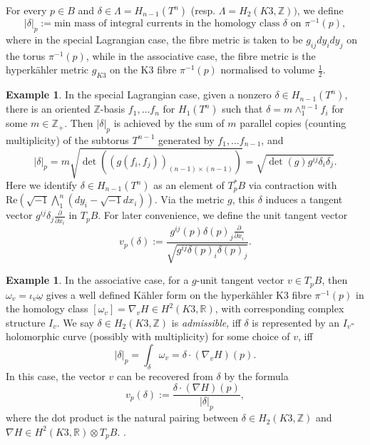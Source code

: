 \documentclass{article}
\theoremstyle{definition}
\newtheorem{eg}[thm]{Example}
\newcommand{\R}{\mathbb{R}}
\newcommand{\Z}{\mathbb{Z}}
\begin{document}
		
		
		

		For every $p\in B$ and $\delta\in \Lambda= H_{n-1}(T^n)$ (resp. $\Lambda= H_2(K3,\Z))$, we define 
		\begin{equation}
		|\delta|_p:=  \text{min mass of integral currents in the homology class $\delta$ on  $\pi^{-1}(p)$} ,
		\end{equation}
		where in the special Lagrangian case, the fibre metric is taken to be $g_{ij} dy_i dy_j$ on the torus $\pi^{-1}(p)$, while in the associative case, the fibre metric is the hyperk\"ahler metric $g_{K3}$ on the K3 fibre $\pi^{-1}(p)$  normalised to volume $\frac{1}{2}$. 




\begin{eg}\label{eg:minareatorus}
In the special Lagrangian case, given a nonzero $\delta\in H_{n-1}(T^n)$, there is an oriented $\Z$-basis $f_1,\ldots f_n$ for $H_1(T^n)$ such that $\delta= m \wedge_1^{n-1} f_i$ for some $m\in \Z_+$. Then $|\delta|_p$ is achieved by the sum of $m$ parallel copies (counting multiplicity) of the subtorus $T^{n-1}$ generated by $f_1,\ldots f_{n-1}$, and 
\[
|\delta|_p= m \sqrt{  \det( ( g(f_i, f_j) )_{(n-1)\times (n-1)}   ) }=     \sqrt{ \det(g)  g^{ij} \delta_i \delta_j }.
\]
Here we identify $\delta \in H_{n-1}(T^n)$ as an element of $T_p^* B$ via contraction with $\text{Re}(\sqrt{-1} \bigwedge_1^n(dy_i- \sqrt{-1} dx_i) )$. Via the metric $g$, this $\delta$ induces a tangent vector $g^{ij}\delta_j \frac{\partial}{\partial x_i}   
	$ in $T_p B$. For later convenience, we define the unit tangent vector 
\begin{equation}
v_p(\delta):= \frac{ g^{ij}(p) \delta(p)_j \frac{\partial}{\partial x_i}  }{    \sqrt{   g^{ij}\delta(p)_i \delta(p)_j }   }.
\end{equation}



\end{eg}



\begin{eg}\label{eg:K3holocurve}
In the associative case, for a $g$-unit tangent vector $v\in T_p B$, then $\omega_v=\iota_v \underline{\omega}$ gives a well defined K\"ahler form on the hyperk\"ahler K3 fibre $\pi^{-1}(p)$ in the homology class $[\omega_v]= \nabla_v H\in H^2(K3,\R)$, with corresponding complex structure $I_v$. We say $\delta\in H_2(K3,\Z )$ is \emph{admissible}, iff $\delta$
is represented by an $I_v$-holomorphic curve (possibly with multiplicity) for some choice of $v$, iff
\[
|\delta|_p =  \int_\delta \omega_v =    \delta\cdot (\nabla_v H)(p).
\]
In this case, the vector $v$ can be recovered from $\delta$ by the formula
\begin{equation}
v_p(\delta):=   \frac{ \delta\cdot (\nabla H)(p)  }{ |\delta|_p   } ,
\end{equation}
where the dot product is the natural pairing between $\delta \in H_2(K3,\Z)$ and $\nabla H\in H^2(K3,\R)\otimes T_p B$. .
\end{eg}
\end{document}
